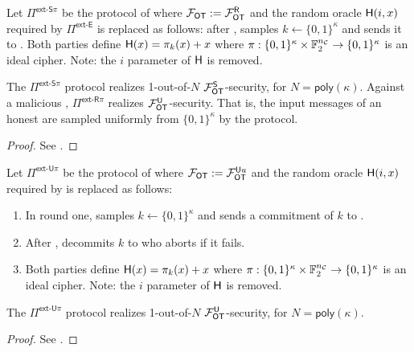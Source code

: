 \begin{definition}\label{def:ext_R_S}
	Let $\Pi^{\textsf{ext-S}\pi}$ be the protocol of  where $\mathcal{F}_{\mathsf{OT}}:=\mathcal{F}_{\mathsf{OT}}^\mathsf{R}$ and the random oracle $\mathsf{H}(i,x)$ required by $\Pi^{\textsf{ext-E}}$ is replaced as follows: after , \send samples $k\gets\{0,1\}^{\kappa}$ and sends it to \rec. Both parties define $\mathsf{H}(x)=\pi_k(x)+x$ where $\pi:\{0,1\}^{\kappa} \times \mathbb{F}^{{n_\mathcal{C}}}_2 \rightarrow\{0,1\}^\kappa$ is an ideal cipher. Note: the $i$ parameter of $\mathsf{H}$ is removed.
\end{definition}
\begin{lemma}\label{lem:ext_R_S}
	The $\Pi^{\textsf{ext-S}\pi}$ protocol realizes 1-out-of-$N$ $\mathcal{F}_{\mathsf{OT}}^\mathsf{S}$-security, for $N=\textsf{poly}(\kappa)$. Against a malicious \rec,  $\Pi^{\textsf{ext-R}\pi}$ realizes $\mathcal{F}_{\mathsf{OT}}^\mathsf{U}$-security. That is, the input messages of an honest \send are sampled uniformly from $\{0,1\}^\kappa$ by the protocol.
\end{lemma}
\iffullversion

\else
\begin{proof}
	See .
	\pe
\end{proof}
\fi

\begin{definition}\label{def:ext_U_U}
	Let $\Pi^{\textsf{ext-U}\pi}$ be the protocol of  where $\mathcal{F}_{\mathsf{OT}}:=\mathcal{F}_{\mathsf{OT}}^{\mathsf{U} u}$ and the random oracle $\mathsf{H}(i,x)$ required by  is replaced as follows:
	\begin{enumerate}
		\item In round one, \send samples $k\gets\{0,1\}^{\kappa}$ and sends a commitment of $k$ to \rec.
		\item After , \send decommits $k$ to \rec who aborts if it fails.
		\item Both parties define $\mathsf{H}(x)=\pi_k(x)+x$ where $\pi:\{0,1\}^{\kappa} \times \mathbb{F}^{{n_\mathcal{C}}}_2 \rightarrow\{0,1\}^\kappa$ is an ideal cipher. Note: the $i$ parameter of $\mathsf{H}$ is removed.
	\end{enumerate}
\end{definition}

\begin{lemma}\label{lem:ext_U_U}
	The $\Pi^{\textsf{ext-U}\pi}$ protocol realizes 1-out-of-$N$ $\mathcal{F}_{\mathsf{OT}}^\mathsf{U}$-security, for $N=\textsf{poly}(\kappa)$.
\end{lemma}
\iffullversion

\else
\begin{proof}
See .
\pe
\end{proof}
\fi

